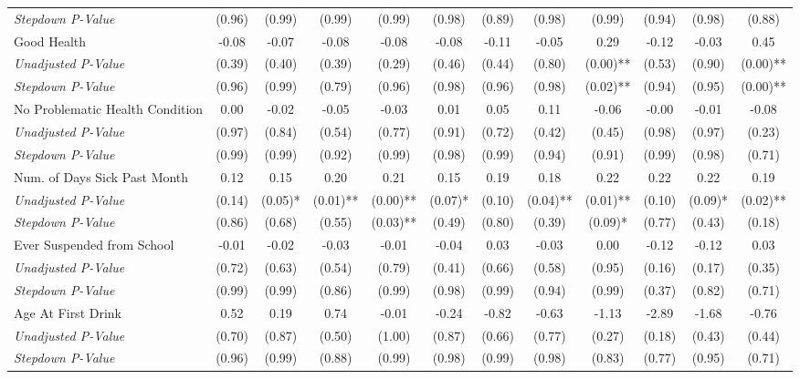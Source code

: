 \begin{tabular}{l c c c c c c c c c c c}
\quad \textit{Stepdown P-Value} & (0.96) & (0.99) & (0.99) & (0.99) & (0.98) & (0.89) & (0.98) & (0.99) & (0.94) & (0.98) & (0.88) \\
Good Health & -0.08 & -0.07 & -0.08 & -0.08 & -0.08 & -0.11 & -0.05 & 0.29 & -0.12 & -0.03 & 0.45 \\
\quad \textit{Unadjusted P-Value} & (0.39) & (0.40) & (0.39) & (0.29) & (0.46) & (0.44) & (0.80) & (0.00)** & (0.53) & (0.90) & (0.00)** \\
\quad \textit{Stepdown P-Value} & (0.96) & (0.99) & (0.79) & (0.96) & (0.98) & (0.96) & (0.98) & (0.02)** & (0.94) & (0.95) & (0.00)** \\
No Problematic Health Condition & 0.00 & -0.02 & -0.05 & -0.03 & 0.01 & 0.05 & 0.11 & -0.06 & -0.00 & -0.01 & -0.08 \\
\quad \textit{Unadjusted P-Value} & (0.97) & (0.84) & (0.54) & (0.77) & (0.91) & (0.72) & (0.42) & (0.45) & (0.98) & (0.97) & (0.23) \\
\quad \textit{Stepdown P-Value} & (0.99) & (0.99) & (0.92) & (0.99) & (0.98) & (0.99) & (0.94) & (0.91) & (0.99) & (0.98) & (0.71) \\
Num. of Days Sick Past Month & 0.12 & 0.15 & 0.20 & 0.21 & 0.15 & 0.19 & 0.18 & 0.22 & 0.22 & 0.22 & 0.19 \\
\quad \textit{Unadjusted P-Value} & (0.14) & (0.05)* & (0.01)** & (0.00)** & (0.07)* & (0.10) & (0.04)** & (0.01)** & (0.10) & (0.09)* & (0.02)** \\
\quad \textit{Stepdown P-Value} & (0.86) & (0.68) & (0.55) & (0.03)** & (0.49) & (0.80) & (0.39) & (0.09)* & (0.77) & (0.43) & (0.18) \\
Ever Suspended from School & -0.01 & -0.02 & -0.03 & -0.01 & -0.04 & 0.03 & -0.03 & 0.00 & -0.12 & -0.12 & 0.03 \\
\quad \textit{Unadjusted P-Value} & (0.72) & (0.63) & (0.54) & (0.79) & (0.41) & (0.66) & (0.58) & (0.95) & (0.16) & (0.17) & (0.35) \\
\quad \textit{Stepdown P-Value} & (0.99) & (0.99) & (0.86) & (0.99) & (0.98) & (0.99) & (0.94) & (0.99) & (0.37) & (0.82) & (0.71) \\
Age At First Drink & 0.52 & 0.19 & 0.74 & -0.01 & -0.24 & -0.82 & -0.63 & -1.13 & -2.89 & -1.68 & -0.76 \\
\quad \textit{Unadjusted P-Value} & (0.70) & (0.87) & (0.50) & (1.00) & (0.87) & (0.66) & (0.77) & (0.27) & (0.18) & (0.43) & (0.44) \\
\quad \textit{Stepdown P-Value} & (0.96) & (0.99) & (0.88) & (0.99) & (0.98) & (0.99) & (0.98) & (0.83) & (0.77) & (0.95) & (0.71) \\
\bottomrule
\end{tabular}
